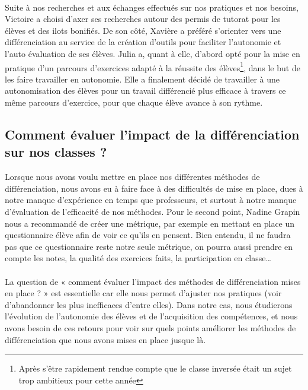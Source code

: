 \paragraph{}Suite à nos recherches et aux échanges effectués sur nos pratiques et nos besoins, Victoire a choisi d’axer ses recherches autour des permis de tutorat pour les élèves et des ilots bonifiés. De son côté, Xavière a préféré s’orienter vers une différenciation au service de la création d'outils pour faciliter l'autonomie et l'auto évaluation de ses élèves. Julia a, quant à elle, d’abord opté pour la mise en pratique d’un parcours d’exercices adapté à la réussite des élèves\footnote{Après s'être rapidement rendue compte que le classe inversée était un sujet trop ambitieux pour cette année}, dans le but de les faire travailler en autonomie. Elle a finalement décidé de travailler à une autonomisation des élèves pour un travail différencié plus efficace à travers ce même parcours d’exercice, pour que chaque élève avance à son rythme.

\subsection{Comment évaluer l'impact de la différenciation sur nos classes ?}

Lorsque nous avons voulu mettre en place nos différentes méthodes de différenciation, nous avons eu à faire face à des difficultés de mise en place, dues à notre manque d’expérience en temps que professeurs, et surtout à notre manque d’évaluation de l’efficacité de nos méthodes. Pour le second point, Nadine Grapin nous a recommandé de créer une métrique, par exemple en mettant en place un questionnaire élève afin de voir ce qu’ils en pensent. Bien entendu, il ne faudra pas que ce questionnaire reste notre seule métrique, on pourra aussi prendre en compte les notes, la qualité des exercices faits, la participation en classe\ldots
\paragraph{} La question de « comment évaluer l’impact des méthodes de différenciation mises en place ? » est essentielle car elle nous permet d'ajuster nos pratiques (voir d'abandonner les plus inefficaces d'entre elles). Dans notre cas, nous étudierons l’évolution de l’autonomie des élèves et de l’acquisition des compétences, et nous avons besoin de ces retours pour voir sur quels points améliorer les méthodes de différenciation que nous avons mises en place jusque là.

